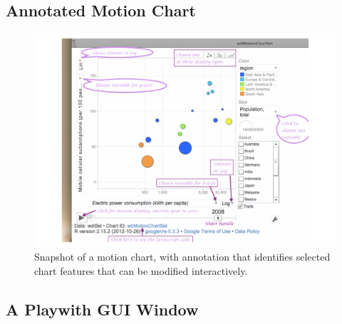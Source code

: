 \enlargethispage{60pt}

\subsection*{Annotated Motion Chart}

\begin{figure}[h]
\vspace*{-6pt}
\centerline{\includegraphics[scale=0.88]{colorArt/motionchart}}%
\caption{Snapshot of a motion chart, with annotation
  that identifies selected chart features that can be
  modified interactively.\label{col:mchart}}
\vspace*{-18pt}
\end{figure}

\newpage

\subsection*{A Playwith GUI Window}

\enlargethispage{30pt}

